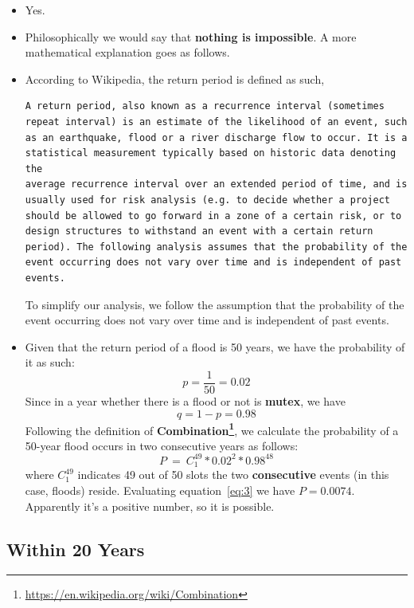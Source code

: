\documentclass[12pt]{article}
\begin{document}
\begin{itemize}
\item Yes.
\item Philosophically we would say that \textbf{nothing is
    impossible}. A more mathematical explanation goes as follows.
\item According to Wikipedia, the return period is defined as such,
\begin{verbatim}
A return period, also known as a recurrence interval (sometimes 
repeat interval) is an estimate of the likelihood of an event, such 
as an earthquake, flood or a river discharge flow to occur. It is a
statistical measurement typically based on historic data denoting the
average recurrence interval over an extended period of time, and is
usually used for risk analysis (e.g. to decide whether a project
should be allowed to go forward in a zone of a certain risk, or to
design structures to withstand an event with a certain return
period). The following analysis assumes that the probability of the
event occurring does not vary over time and is independent of past
events. 
\end{verbatim}
  To simplify our analysis, we follow the assumption that the
  probability of the event occurring does not vary over time and is
  independent of past events.
\item Given that the return period of a flood is 50 years, we have the
  probability of it as such:
  \begin{equation}
    \label{eq:1}
    p=\frac{1}{50}=0.02
  \end{equation}
  Since in a year whether there is a flood or not is \textbf{mutex},
  we have 
  \begin{equation}
    \label{eq:2}
    q = 1-p = 0.98
  \end{equation}
  Following the definition of
  \textbf{Combination\footnote{\url{https://en.wikipedia.org/wiki/Combination}}},
  we calculate the probability of a 50-year flood occurs in two
  consecutive years as follows:
  \begin{equation}
    \label{eq:3}
    P~=~C^{49}_{1}*0.02^{2}*0.98^{48}
  \end{equation}
  where $C^{49}_{1}$ indicates 49 out of 50 slots the two
  \textbf{consecutive} events (in this case, floods)
  reside. Evaluating equation~\eqref{eq:3} we have
  $P=0.0074$. Apparently it's a positive number, so it is possible.
\end{itemize}

\subsection{Within 20 Years}
\label{sec:within-20-years}
\end{document}
